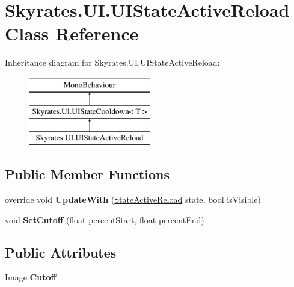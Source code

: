 \hypertarget{class_skyrates_1_1_u_i_1_1_u_i_state_active_reload}{\section{Skyrates.\-U\-I.\-U\-I\-State\-Active\-Reload Class Reference}
\label{class_skyrates_1_1_u_i_1_1_u_i_state_active_reload}
}
Inheritance diagram for Skyrates.\-U\-I.\-U\-I\-State\-Active\-Reload\-:\begin{figure}[H]
\begin{center}
\leavevmode
\includegraphics[height=3.000000cm]{class_skyrates_1_1_u_i_1_1_u_i_state_active_reload}
\end{center}
\end{figure}
\subsection*{Public Member Functions}
\begin{DoxyCompactItemize}
\item 
\hypertarget{class_skyrates_1_1_u_i_1_1_u_i_state_active_reload_a33e17c910babfa3b3388dd0dfdb16208}{override void {\bfseries Update\-With} (\hyperlink{class_skyrates_1_1_misc_1_1_state_active_reload}{State\-Active\-Reload} state, bool is\-Visible)}\label{class_skyrates_1_1_u_i_1_1_u_i_state_active_reload_a33e17c910babfa3b3388dd0dfdb16208}

\item 
\hypertarget{class_skyrates_1_1_u_i_1_1_u_i_state_active_reload_a86ce8a58d5796a4a0c3323543ed0acca}{void {\bfseries Set\-Cutoff} (float percent\-Start, float percent\-End)}\label{class_skyrates_1_1_u_i_1_1_u_i_state_active_reload_a86ce8a58d5796a4a0c3323543ed0acca}

\end{DoxyCompactItemize}
\subsection*{Public Attributes}
\begin{DoxyCompactItemize}
\item 
\hypertarget{class_skyrates_1_1_u_i_1_1_u_i_state_active_reload_ab90308da3c0f0dbbaa790b8f8c099c2b}{Image {\bfseries Cutoff}}\label{class_skyrates_1_1_u_i_1_1_u_i_state_active_reload_ab90308da3c0f0dbbaa790b8f8c099c2b}

\end{DoxyCompactItemize}

